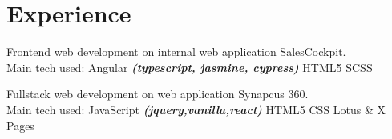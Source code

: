 \documentclass[a4paper]{deedy-resume_twopage} %
\begin{document}

\lastupdated %



\begin{minipage}[t]{0.66\textwidth} %



  \section{Experience}
  \item Frontend web development on internal web application SalesCockpit.
  \\ Main tech used: \textbullet{} Angular {\footnotesize \textit{\textbf{(typescript, jasmine, cypress)}}} \textbullet{} HTML5 \textbullet{} SCSS 

  \sectionspace %


  \item Fullstack web development on web application Synapcus 360.
  \\ Main tech used: \textbullet{} JavaScript {\footnotesize \textit{\textbf{(jquery,vanilla,react)}}} \textbullet{} HTML5 \textbullet{} CSS \textbullet{} Lotus \& X Pages


\end{minipage}
\end{document}
